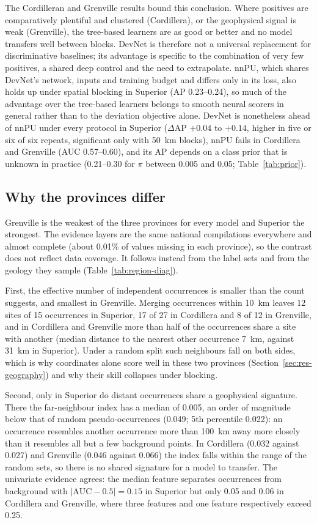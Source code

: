 \documentclass[pdflatex,sn-apa]{sn-jnl}
\begin{document}
The Cordilleran and Grenville results bound this conclusion. Where positives are comparatively plentiful and clustered (Cordillera), or the geophysical signal is weak (Grenville), the tree-based learners are as good or better and no model transfers well between blocks. DevNet is therefore not a universal replacement for discriminative baselines; its advantage is specific to the combination of very few positives, a shared deep control and the need to extrapolate. nnPU, which shares DevNet's network, inputs and training budget and differs only in its loss, also holds up under spatial blocking in Superior (AP 0.23--0.24), so much of the advantage over the tree-based learners belongs to smooth neural scorers in general rather than to the deviation objective alone. DevNet is nonetheless ahead of nnPU under every protocol in Superior ($\Delta$AP $+0.04$ to $+0.14$, higher in five or six of six repeats, significant only with 50~km blocks), nnPU fails in Cordillera and Grenville (AUC 0.57--0.60), and its AP depends on a class prior that is unknown in practice (0.21--0.30 for $\pi$ between 0.005 and 0.05; Table~\ref{tab:prior}).

\subsection{Why the provinces differ}\label{sec:disc-provinces}

Grenville is the weakest of the three provinces for every model and Superior the strongest. The evidence layers are the same national compilations everywhere and almost complete (about 0.01\% of values missing in each province), so the contrast does not reflect data coverage. It follows instead from the label sets and from the geology they sample (Table~\ref{tab:region-diag}).

First, the effective number of independent occurrences is smaller than the count suggests, and smallest in Grenville. Merging occurrences within 10~km leaves 12 sites of 15 occurrences in Superior, 17 of 27 in Cordillera and 8 of 12 in Grenville, and in Cordillera and Grenville more than half of the occurrences share a site with another (median distance to the nearest other occurrence 7~km, against 31~km in Superior). Under a random split such neighbours fall on both sides, which is why coordinates alone score well in these two provinces (Section~\ref{sec:res-geography}) and why their skill collapses under blocking.

Second, only in Superior do distant occurrences share a geophysical signature. There the far-neighbour index has a median of 0.005, an order of magnitude below that of random pseudo-occurrences (0.049; 5th percentile 0.022): an occurrence resembles another occurrence more than 100~km away more closely than it resembles all but a few background points. In Cordillera (0.032 against 0.027) and Grenville (0.046 against 0.066) the index falls within the range of the random sets, so there is no shared signature for a model to transfer. The univariate evidence agrees: the median feature separates occurrences from background with $|\mathrm{AUC}-0.5| = 0.15$ in Superior but only 0.05 and 0.06 in Cordillera and Grenville, where three features and one feature respectively exceed 0.25.
\end{document}

